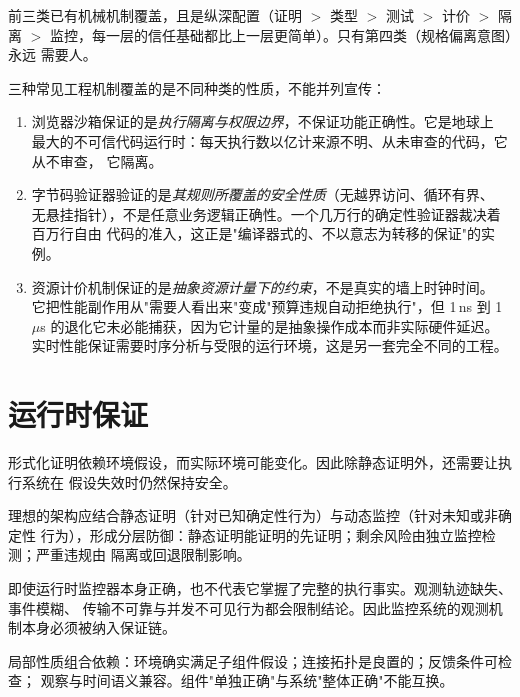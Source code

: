 前三类已有机械机制覆盖，且是纵深配置（证明 $>$ 类型 $>$ 测试 $>$ 计价 $>$
隔离 $>$ 监控，每一层的信任基础都比上一层更简单）。只有第四类（规格偏离意图）永远
需要人。

\begin{remark}[三类工程原型的保证范围]\label{rmk:three-prototypes}
三种常见工程机制覆盖的是不同种类的性质，不能并列宣传：
\begin{enumerate}[label=(\alph*)]
\item 浏览器沙箱保证的是\emph{执行隔离与权限边界}，不保证功能正确性。它是地球上
      最大的不可信代码运行时：每天执行数以亿计来源不明、从未审查的代码，它从不审查，
      它隔离。
\item 字节码验证器验证的是\emph{其规则所覆盖的安全性质}（无越界访问、循环有界、
      无悬挂指针），不是任意业务逻辑正确性。一个几万行的确定性验证器裁决着百万行自由
      代码的准入，这正是"编译器式的、不以意志为转移的保证"的实例。
\item 资源计价机制保证的是\emph{抽象资源计量下的约束}，不是真实的墙上时钟时间。
      它把性能副作用从"需要人看出来"变成"预算违规自动拒绝执行"，但 1\,ns 到
      1\,$\mu$s 的退化它未必能捕获，因为它计量的是抽象操作成本而非实际硬件延迟。
      实时性能保证需要时序分析与受限的运行环境，这是另一套完全不同的工程。
\end{enumerate}
\end{remark}

\section{运行时保证}\label{sec:runtime}

形式化证明依赖环境假设，而实际环境可能变化。因此除静态证明外，还需要让执行系统在
假设失效时仍然保持安全。

\begin{principle}[分层防御]\label{pr:layered-defense}
理想的架构应结合静态证明（针对已知确定性行为）与动态监控（针对未知或非确定性
行为），形成分层防御：静态证明能证明的先证明；剩余风险由独立监控检测；严重违规由
隔离或回退限制影响。
\end{principle}

\begin{remark}[监控自身的边界]\label{rmk:monitor-limit}
即使运行时监控器本身正确，也不代表它掌握了完整的执行事实。观测轨迹缺失、事件模糊、
传输不可靠与并发不可见行为都会限制结论。因此监控系统的观测机制本身必须被纳入保证链。
\end{remark}

\begin{remark}[契约组合的四个条件]\label{rmk:contract-conds}
局部性质组合依赖：环境确实满足子组件假设；连接拓扑是良置的；反馈条件可检查；
观察与时间语义兼容。组件"单独正确"与系统"整体正确"不能互换。
\end{remark}

